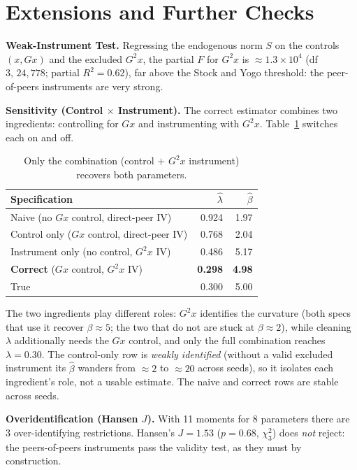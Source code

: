 \documentclass[11pt]{article}
\renewcommand{\_}{\textunderscore\allowbreak}
\begin{document}
\section{Extensions and Further Checks}
\textbf{Weak-Instrument Test.} Regressing the endogenous norm $S$ on the controls $(x,Gx)$ and the excluded $G^2x$, the partial $F$ for $G^2x$ is $\approx 1.3\times10^{4}$ (df $3,\,24{,}778$; partial $R^2=0.62$), far above the Stock and Yogo threshold: the peer-of-peers instruments are very strong.

\textbf{Sensitivity (Control $\times$ Instrument).} The correct estimator combines two ingredients: controlling for $Gx$ and instrumenting with $G^2x$. Table~\ref{tab:sens} switches each on and off.
\begin{table}[h]\centering\small
\caption{Only the combination (control $+$ $G^2x$ instrument) recovers both parameters.}\label{tab:sens}
\begin{tabular}{lrr}
\toprule
Specification & $\widehat\lambda$ & $\widehat\beta$ \\
\midrule
Naive (no $Gx$ control, direct-peer IV) & 0.924 & 1.97 \\
Control only ($Gx$ control, direct-peer IV) & 0.768 & 2.04 \\
Instrument only (no control, $G^2x$ IV) & 0.486 & 5.17 \\
\textbf{Correct} ($Gx$ control, $G^2x$ IV) & \textbf{0.298} & \textbf{4.98} \\
\midrule
True & 0.300 & 5.00 \\
\bottomrule
\end{tabular}
\end{table}
The two ingredients play different roles: $G^2x$ identifies the curvature (both specs that use it recover $\beta\approx5$; the two that do not are stuck at $\beta\approx2$), while cleaning $\lambda$ additionally needs the $Gx$ control, and only the full combination reaches $\lambda=0.30$. The control-only row is \emph{weakly identified} (without a valid excluded instrument its $\widehat\beta$ wanders from $\approx2$ to $\approx20$ across seeds), so it isolates each ingredient's role, not a usable estimate. The naive and correct rows are stable across seeds.

\textbf{Overidentification (Hansen $J$).} With 11 moments for 8 parameters there are 3 over-identifying restrictions. Hansen's $J=1.53$ ($p=0.68$, $\chi^2_3$) does \emph{not} reject: the peers-of-peers instruments pass the validity test, as they must by construction.
\end{document}
